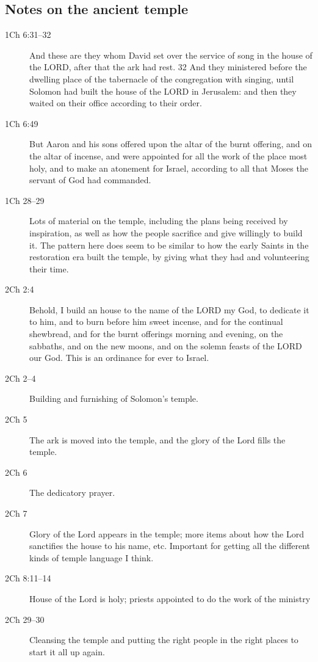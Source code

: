 	\subsection{Notes on the ancient temple} %

		\begin{description}
		\item[1Ch 6:31--32] And these are they whom David set over the service of song in the house of the LORD, after that the ark had rest. 32 And they ministered before the dwelling place of the tabernacle of the congregation with singing, until Solomon had built the house of the LORD in Jerusalem: and then they waited on their office according to their order.
		\item[1Ch 6:49] But Aaron and his sons offered upon the altar of the burnt offering, and on the altar of incense, and were appointed for all the work of the place most		holy, and to make an atonement for Israel, according to all that Moses the servant of God had commanded.
		\item[1Ch 28--29] Lots of material on the temple, including the plans being received by inspiration, as well as how the people sacrifice and give willingly to build it. The pattern here does seem to be similar to how the early Saints in the restoration era built the temple, by giving what they had and volunteering their time.
		\item[2Ch 2:4] Behold, I build an house to the name of the LORD my God, to dedicate it to him, and to burn before him sweet incense, and for the continual shewbread, and	for the burnt offerings morning and evening, on the sabbaths, and on the new moons, and on the solemn feasts of the LORD our God. This is an ordinance for ever to Israel.
		\item[2Ch 2--4] Building and furnishing of Solomon's temple.
		\item[2Ch 5] The ark is moved into the temple, and the glory of the Lord fills the temple.
		\item[2Ch 6] The dedicatory prayer.
		\item[2Ch 7] Glory of the Lord appears in the temple; more items about how the Lord sanctifies the house to his name, etc. Important for getting all the different kinds of temple language I think.
		\item[2Ch 8:11--14] House of the Lord is holy; priests appointed to do the work of the ministry
		\item[2Ch 29--30] Cleansing the temple and putting the right people in the right places to start it all up again.

\end{description}

